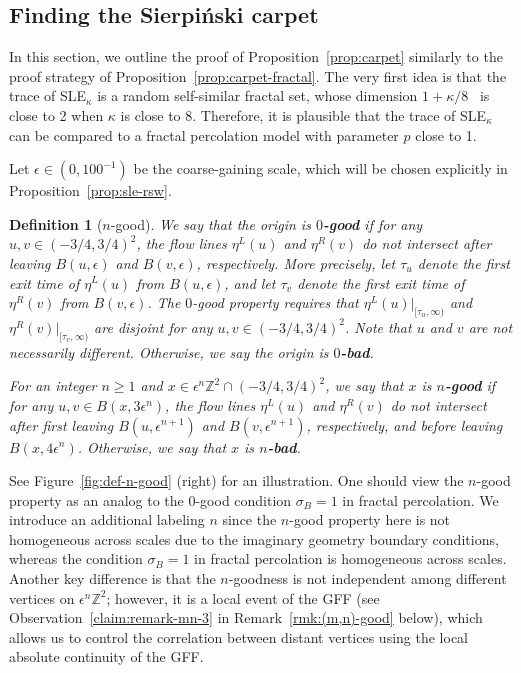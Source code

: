 \documentclass[a4paper]{article}
\numberwithin{equation}{section}
\newtheorem{definition}[theorem]{Definition}
\numberwithin{equation}{section}
\renewcommand{\1}{\mathbf{1}}
\begin{document}
\subsection{Finding the Sierpi\'nski carpet}\label{subsec:disconnectivity}

In this section, we outline the proof of Proposition~\ref{prop:carpet} similarly to the proof strategy of Proposition~\ref{prop:carpet-fractal}. The very first idea is that the trace of SLE$_\kappa$ is a random self-similar fractal set, whose dimension $1+\kappa/8$~\cite{Beffara-dimension} is close to 2 when $\kappa$ is close to 8. Therefore, it is plausible that the trace of SLE$_\kappa$ can be compared to a fractal percolation model with parameter $p$ close to 1.

Let $\epsilon \in (0,100^{-1})$ be the coarse-gaining scale, which will be chosen explicitly in Proposition~\ref{prop:sle-rsw}.

\begin{definition}[$n$-good]\label{def:n-good}
We say that the origin is \textbf{$0$-good} if for any $u,v \in (-3/4, 3/4)^2$, the flow lines $\eta^L(u)$ and $\eta^R(v)$ do not intersect after leaving $B(u, \epsilon)$ and $B(v, \epsilon)$, respectively. More precisely, let $\tau_u$ denote the first exit time of $\eta^L(u)$ from $B(u, \epsilon)$, and let $\tau_v$ denote the first exit time of $\eta^R(v)$ from $B(v, \epsilon)$. The $0$-good property requires that $\eta^L(u)|_{[\tau_u,\infty)}$ and $\eta^R(v)|_{[\tau_v,\infty)}$ are disjoint for any $u,v \in (-3/4,3/4)^2$. Note that $u$ and $v$ are not necessarily different. Otherwise, we say the origin is \textbf{$0$-bad}.

For an integer $n \geq 1$ and $x \in \epsilon^n \mathbb{Z}^2 \cap (-3/4,3/4)^2$, we say that $x$ is \textbf{$n$-good} if for any $u,v \in B(x, 3 \epsilon^n)$, the flow lines $\eta^L(u)$ and $\eta^R(v)$ do not intersect after first leaving $B(u, \epsilon^{n+1})$ and $B(v, \epsilon^{n+1})$, respectively, and before leaving $B(x, 4 \epsilon^n)$. Otherwise, we say that $x$ is \textbf{$n$-bad}.
\end{definition}

See Figure~\ref{fig:def-n-good} (right) for an illustration. One should view the $n$-good property as an analog to the $0$-good condition $\sigma_B=1$ in fractal percolation. We introduce an additional labeling $n$ since the $n$-good property here is not homogeneous across scales due to the imaginary geometry boundary conditions, whereas the condition $\sigma_B = 1$ in fractal percolation is homogeneous across scales. Another key difference is that the $n$-goodness is not independent among different vertices on $\epsilon^n \mathbb{Z}^2$; however, it is a local event of the GFF (see Observation~\eqref{claim:remark-mn-3} in Remark~\ref{rmk:(m,n)-good} below), which allows us to control the correlation between distant vertices using the local absolute continuity of the GFF.
\end{document}
